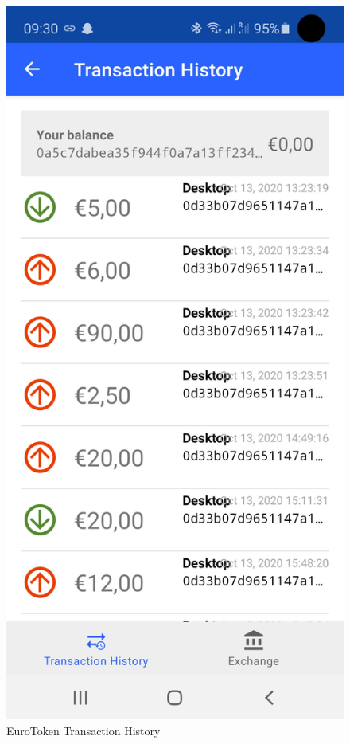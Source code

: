 \documentclass[whitelogo]{tudelft-report}
\begin{document}
\begin{figure}[htbp]
\centering
\includegraphics{../images/eurotoken_transaction_history.jpg}
\caption{EuroToken Transaction History
\label{transaction_history_label}}
\end{figure}
\end{document}
